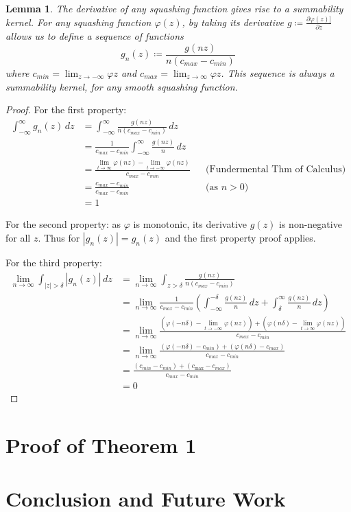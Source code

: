 \documentclass{article} %
\newtheorem{lem}[thm]{Lemma}
\newcommand{\dlim}{\displaystyle\lim}
\begin{document}
\begin{lem}{The derivative of any squashing function gives rise to a summability kernel.}
	For any squashing function $\varphi(z)$,
	by taking its derivative $g \coloneqq \frac{\partial\varphi(z)]}{\partial z}$ allows us to define a sequence of functions 
	\begin{equation}
	g_n(z) \coloneqq \frac{g(nz)}{n\left( c_{max} - c_{min} \right)} 
	\end{equation}
	 where $c_{min}=\lim_{z \to -\infty} \varphi{z}$ and $c_{max}=\lim_{z \to \infty} \varphi{z}$.
	This sequence is always a summability kernel, for any smooth squashing function.
	
\end{lem}
\begin{proof}
For the first property:
\begin{align}
	\int_{-\infty}^{\infty} g_n(z) \, dz &=  \int_{-\infty}^{\infty} \frac{g(nz)}{n\left( c_{max} - c_{min} \right)} \, dz \\
	&= \frac{1}{c_{max} - c_{min}} \int_{-\infty}^{\infty} \frac{g(nz)}{n} \, dz \\
	&= \frac{\dlim_{t \to \infty} \varphi(nz) - \dlim_{t \to -\infty} \varphi(nz)}{c_{max} - c_{min}} && \text{(Fundermental Thm of Calculus)}\\
	&= \frac{c_{max} - c_{min}}{c_{max} - c_{min}}  && \text{(as $n>0$)}\\
	&= 1	
\end{align}
	
For the second property: as  $\varphi$ is monotonic, its derivative $g(z)$ is non-negative for all $z$. Thus for $|g_n(z)|=g_n(z)$ and the first property proof applies.

For the third property:
\begin{align}
	\lim_{n\to\infty} \int_{|z|>\delta} |g_n(z)|\, dz &= \lim_{n\to\infty} \int_{z>\delta} \frac{g(nz)}{n\left( c_{max} - c_{min} \right)} \\
	 &= \lim_{n\to\infty} \frac{1}{c_{max} - c_{min}} 
		 \left( \int_{-\infty}^{-\delta} \frac{g(nz)}{n} \, dz 
		 + \int_\delta^\infty \frac{g(nz)}{n} \, dz \right) \\
	 &= \lim_{n\to\infty} \frac{
	 	\left(\varphi(-n\delta)-\dlim_{t \to -\infty} \varphi(nz)\right)
	 	 + \left( \varphi(n\delta) - \dlim_{t \to \infty} \varphi(nz)\right)}%
	 	 {c_{max} - c_{min}} \\
	 &= \lim_{n\to\infty} \frac{
	 	\left(\varphi(-n\delta)-c_{min} \right)
	 	+ \left( \varphi(n\delta) - c_{max} \right)}%
	    {c_{max} - c_{min}} \\
	 &= \frac{
	 	\left(c_{min}-c_{min} \right)
	 	+ \left(c_{\max} - c_{max} \right)}%
		{c_{max} - c_{min}} \\
	 &= 0
\end{align}


\end{proof}


\section{Proof of Theorem 1}

\section{Conclusion and Future Work}



\end{document}
